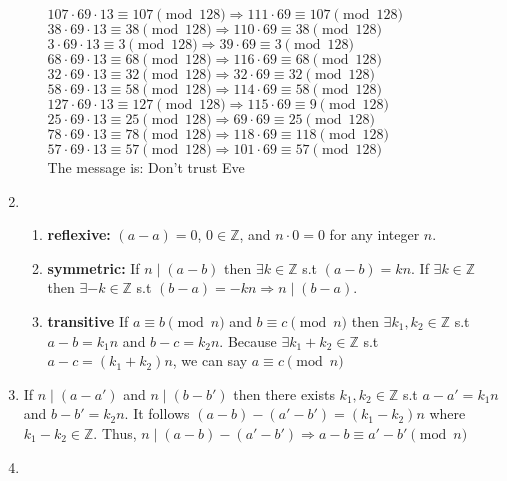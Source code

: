 \documentclass[10pt]{article}
\begin{document}
\begin{enumerate}[label=\arabic*.]
\begin{enumerate}
        $107\cdot69\cdot13\equiv 107\pmod{128}\Rightarrow 111\cdot 69\equiv 107\pmod{128}$\\
        $38\cdot69\cdot13\equiv 38\pmod{128}\Rightarrow 110\cdot 69\equiv 38\pmod{128}$\\
        $3\cdot69\cdot13\equiv 3\pmod{128}\Rightarrow 39\cdot 69\equiv 3\pmod{128}$\\
        $68\cdot69\cdot13\equiv 68\pmod{128}\Rightarrow 116\cdot 69\equiv 68\pmod{128}$\\
        $32\cdot69\cdot13\equiv 32\pmod{128}\Rightarrow 32\cdot 69\equiv 32\pmod{128}$\\
        $58\cdot69\cdot13\equiv 58\pmod{128}\Rightarrow 114\cdot 69\equiv 58\pmod{128}$\\
        $127\cdot69\cdot13\equiv 127\pmod{128}\Rightarrow 115\cdot 69\equiv 9\pmod{128}$\\
        $25\cdot69\cdot13\equiv 25\pmod{128}\Rightarrow 69\cdot 69\equiv 25\pmod{128}$\\
        $78\cdot69\cdot13\equiv 78\pmod{128}\Rightarrow 118\cdot 69\equiv 118\pmod{128}$\\
        $57\cdot69\cdot13\equiv 57\pmod{128}\Rightarrow 101\cdot 69\equiv 57\pmod{128}$\\
        The message is: Don't trust Eve
    \end{enumerate}
    \item \begin{enumerate}
        \item \textbf{reflexive:} $(a-a)=0$, $0\in\mathbb{Z}$, and $n\cdot0=0$ for any integer $n$.
        \item \textbf{symmetric:} If $n\mid(a-b)$ then $\exists k\in\mathbb{Z}$ s.t $(a-b)=kn$. If $\exists k\in\mathbb{Z}$ then $\exists-k\in\mathbb{Z}$ s.t $(b-a)=-kn\Rightarrow n\mid (b-a)$.
        \item \textbf{transitive} If $a\equiv b\pmod{n}$ and $b\equiv c\pmod{n}$ then $\exists k_1,k_2\in\mathbb{Z}$ s.t $a-b=k_1n$ and $b-c=k_2n$. Because $\exists k_1+k_2\in\mathbb{Z}$ s.t $a-c=(k_1+k_2)n$, we can say $a\equiv c\pmod{n}$
    \end{enumerate}
    \item If $n\mid (a-a')$ and $n\mid (b-b')$ then there exists $k_1,k_2\in\mathbb{Z}$ s.t $a-a'=k_1n$ and $b-b'=k_2n$. 
    It follows $(a-b)-(a'-b')=(k_1-k_2)n$ where $k_1-k_2\in\mathbb{Z}$. 
    Thus, $n\mid (a-b)-(a'-b')\Rightarrow a-b\equiv a'-b'\pmod n$
    \item \begin{enumerate}

\end{enumerate}
\end{enumerate}
\end{document}
